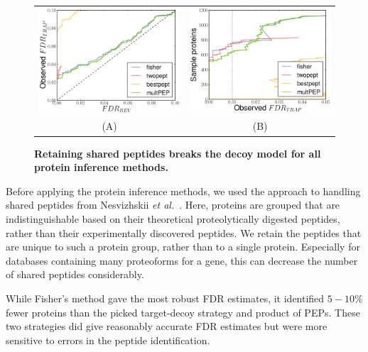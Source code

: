 \documentclass{article}
\begin{document}
\begin{figure}[!htp]
\begin{center}
\begin{tabular}{cc} 
\includegraphics[width=0.45\linewidth]{./img/shared-pept-accuracy} &
\includegraphics[width=0.45\linewidth]{./img/shared-pept-performance}
\\
(A) & (B)
\end{tabular}
\caption{\label{fig:shared-accuracy}\textbf{Retaining shared peptides
breaks the decoy model for all protein inference methods.}}
\end{center}
\end{figure}

Before applying the protein inference methods, we used the approach to
handling shared peptides from Nesvizhskii {\em et
al.}~\cite{nesvizhskii2003statistical}. Here, proteins are grouped
that are indistinguishable based on their theoretical proteolytically
digested peptides, rather than their experimentally discovered
peptides. We retain the peptides that are unique to such a protein
group, rather than to a single protein. Especially for databases
containing many proteoforms for a gene, this can decrease the number
of shared peptides considerably.


While Fisher’s method gave the most robust FDR estimates, it
identified $5-10\%$ fewer proteins than the picked target-decoy
strategy and product of PEPs. These two strategies did give reasonably
accurate FDR estimates but were more sensitive to errors in the
peptide identification.
\end{document}
